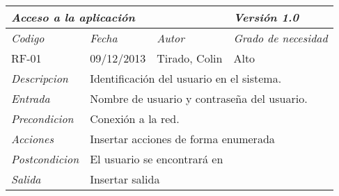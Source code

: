 \begin{tabular}{|p{3cm}|p{3cm}|p{3cm}|p{3cm}|}
\hline \multicolumn{3}{|p{9cm}|}{\textit{Acceso a la aplicaci\'on}} & \textit{Versi\'on 1.0} \\
\hline \textit{Codigo} & \textit{Fecha} & \textit{Autor} & \textit{Grado de necesidad} \\
RF-01 & 09/12/2013 & Tirado, Colin & Alto \\
\hline \textit{Descripcion} & \multicolumn{3}{|p{9cm}|}{Identificaci\'on del usuario en el sistema.} \\
\hline \textit{Entrada} & \multicolumn{3}{|p{9cm}|}{Nombre de usuario y contrase\~na del usuario.} \\
\hline \textit{Precondicion} & \multicolumn{3}{|p{9cm}|}{Conexi\'on a la red.} \\
\hline \textit{Acciones} & \multicolumn{3}{|p{9cm}|}{Insertar acciones de forma enumerada} \\
\hline \textit{Postcondicion} & \multicolumn{3}{|p{9cm}|}{El usuario se encontrar\'a en } \\
\hline \textit{Salida} & \multicolumn{3}{|p{9cm}|}{Insertar salida} \\ \hline
\end{tabular}